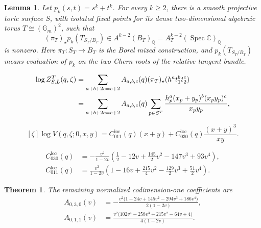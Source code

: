 \documentclass[10pt,a4paper]{amsart}
\newtheorem{thm}{Theorem}
\newtheorem{lem}{Lemma}
\DeclareMathOperator{\Spec}{Spec}
\newcommand{\cc}{\mathbb{C}}
\newcommand{\q}{\mathbb{Q}}
\begin{document}
\begin{lem}\label{pure-tangent-detector}
  Let $p_k(s,t)=s^k+t^k$. For every $k\ge2$, there is a smooth projective
  toric surface $S$, with isolated fixed points for its dense
  two-dimensional algebraic torus $T\cong(\mathbb G_m)^2$, such that
  \[
    (\pi_T)_{\star}p_k(T_{S_T/B_T})
    \in A^{k-2}(B_T)_\q=A_T^{k-2}(\Spec\cc)_\q
  \]
  is nonzero.
  Here $\pi_T:S_T\to B_T$ is the Borel mixed construction, and
  $p_k(T_{S_T/B_T})$ means evaluation of $p_k$ on the two Chern
  roots of the relative tangent bundle.
\end{lem}

\begin{align}
  [\zeta^e]\log Z^T_{S,L}(q,\zeta)
  &=
  \sum_{a+b+2c=e+2}
  A_{a,b,c}(q)(\pi_T)_{\star}(h^a t_1^b t_2^c) \notag\\
  &=
  \sum_{a+b+2c=e+2}
  A_{a,b,c}(q)
  \sum_{p\in S^T}
  \frac{h_p^a(x_p+y_p)^b(x_py_p)^c}{x_py_p},
  \label{compact-logarithmic-vertex-comparison}
\end{align}

\begin{equation}\label{local-edge-expansion}
  [\zeta]\log V(q,\zeta;0,x,y)
  =
  C_{011}^{\mathrm{loc}}(q)(x+y)
  +
  C_{030}^{\mathrm{loc}}(q)\frac{(x+y)^3}{xy}.
\end{equation}

  \begin{align}
    C_{030}^{\mathrm{loc}}(q)
    &=
    -\frac{v^2}{1-2v}
    \left(
      \frac12-12v+\frac{145}{2}v^2-147v^3+93v^4
    \right), \label{local-c030-closed-form}\\
    C_{011}^{\mathrm{loc}}(q)
    &=
    \frac{v^2}{1-2v}
    \left(
      1-16v+\frac{215}{4}v^2-\frac{129}{2}v^3+\frac{51}{2}v^4
    \right). \label{local-c011-closed-form}
  \end{align}

\begin{thm}\label{thm:remaining-surface-codim-one-coefficients}
  The remaining normalized codimension-one coefficients are
  \begin{align}
    A_{0,3,0}(v)
    &=
    -
    \frac{
      v^2\bigl(1-24v+145v^2-294v^3+186v^4\bigr)
    }
    {2(1-2v)}, \\
    A_{0,1,1}(v)
    &=
    \frac{
      v^2\bigl(102v^4-258v^3+215v^2-64v+4\bigr)
    }
    {4(1-2v)} .
  \end{align}
\end{thm}
\end{document}
